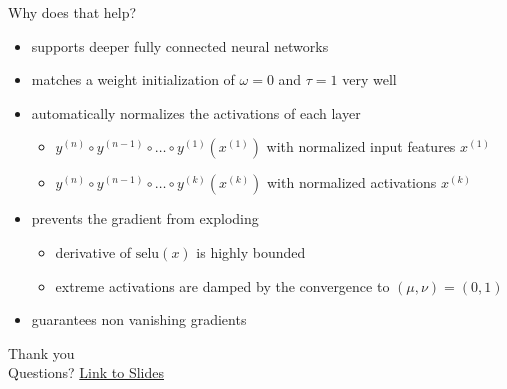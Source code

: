 \documentclass[aspectratio=169]{beamer}
\begin{document}
\begin{frame}{Why does that help?}
\begin{itemize}
\item supports deeper fully connected neural networks
\item matches a weight initialization of $\omega = 0$ and $ \tau = 1 $ very well 
\item automatically normalizes the activations of each layer
\begin{itemize}
\item $y^{(n)} \circ y^{(n - 1)} \circ \ldots \circ y^{(1)}(x^{(1)}) $ with normalized input features $x^{(1)}$
\item $y^{(n)} \circ y^{(n - 1)} \circ \ldots \circ y^{(k)}(x^{(k)}) $ with normalized activations $x^{(k)}$
\end{itemize}
\item prevents the gradient from exploding
\begin{itemize}
\item derivative of $\text{selu}(x) $ is highly bounded
\item extreme activations are damped by the convergence to $(\mu, \nu) = (0, 1)$
\end{itemize}
\item guarantees non vanishing gradients
\end{itemize}

\end{frame}



\begin{frame}[focus]
	Thank you \\
	Questions?
	\vfill
	\href{https://github.com/spirousschuh/presentations/blob/master/paper_slides/self-normalizing_nns/slides.pdf}
		{\small{Link to Slides}}




\end{frame}

\end{document}
